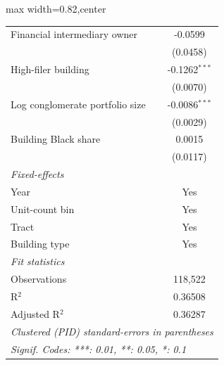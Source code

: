 \begin{table}[htbp]
\begin{adjustbox}{max width=0.82\textwidth,center}
\begin{tabular}{lc}
         Financial intermediary owner    & -0.0599\\   
                                         & (0.0458)\\   
         High-filer building             & -0.1262$^{***}$\\   
                                         & (0.0070)\\   
         Log conglomerate portfolio size & -0.0086$^{***}$\\   
                                         & (0.0029)\\   
         Building Black share            & 0.0015\\   
                                         & (0.0117)\\   
         \midrule
         \emph{Fixed-effects}\\
         Year                            & Yes\\  
         Unit-count bin                  & Yes\\  
         Tract                           & Yes\\  
         Building type                   & Yes\\  
         \midrule
         \emph{Fit statistics}\\
         Observations                    & 118,522\\  
         R$^2$                           & 0.36508\\  
         Adjusted R$^2$                  & 0.36287\\  
         \midrule \midrule
         \multicolumn{2}{l}{\emph{Clustered (PID) standard-errors in parentheses}}\\
         \multicolumn{2}{l}{\emph{Signif. Codes: ***: 0.01, **: 0.05, *: 0.1}}\\
      \end{tabular}
   \end{adjustbox}
\end{table}



